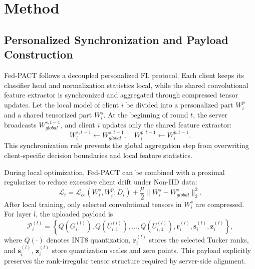\documentclass[conference]{IEEEtran}
\begin{document}
\section{Method}
\subsection{Personalized Synchronization and Payload Construction}

Fed-PACT follows a decoupled personalized FL protocol. Each client keeps its classifier head and normalization statistics local, while the shared convolutional feature extractor is synchronized and aggregated through compressed tensor updates. Let the local model of client $i$ be divided into a personalized part $W_i^{p}$ and a shared tensorized part $W_i^{s}$. At the beginning of round $t$, the server broadcasts $W_{global}^{s,t-1}$, and client $i$ updates only the shared feature extractor:
\begin{equation}
    W_i^{s,t-1}\leftarrow W_{global}^{s,t-1},
    \quad
    W_i^{p,t-1}\leftarrow W_i^{p,t-1}.
\end{equation}
This synchronization rule prevents the global aggregation step from overwriting client-specific decision boundaries and local feature statistics.

During local optimization, Fed-PACT can be combined with a proximal regularizer to reduce excessive client drift under Non-IID data:
\begin{equation}
    \mathcal{L}_i
    =
    \mathcal{L}_{ce}(W_i^{s},W_i^{p};D_i)
    +
    \frac{\mu}{2}
    \|W_i^{s}-W_{global}^{s}\|_2^2.
\end{equation}
After local training, only selected convolutional tensors in $W_i^{s}$ are compressed. For layer $l$, the uploaded payload is
\begin{equation}
    \mathcal{P}_{i}^{(l)}
    =
    \left\{
    Q(G_i^{(l)}),
    Q(U_{i,1}^{(l)}),\ldots,Q(U_{i,4}^{(l)}),
    \mathbf{r}_i^{(l)}, \mathbf{s}_i^{(l)}, \mathbf{z}_i^{(l)}
    \right\},
\end{equation}
where $Q(\cdot)$ denotes INT8 quantization, $\mathbf{r}_i^{(l)}$ stores the selected Tucker ranks, and $\mathbf{s}_i^{(l)}$, $\mathbf{z}_i^{(l)}$ store quantization scales and zero points. This payload explicitly preserves the rank-irregular tensor structure required by server-side alignment.
\end{document}
